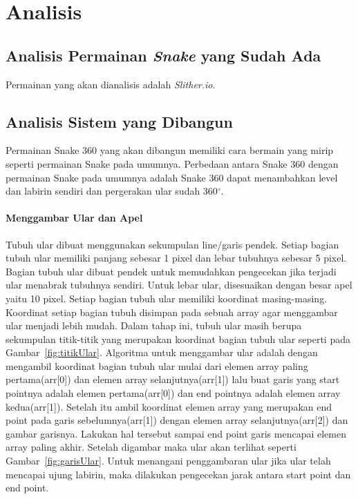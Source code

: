 \chapter{Analisis}
\label{chap:analisis}

\section{Analisis Permainan \textit{Snake} yang Sudah Ada}
Permainan yang akan dianalisis adalah \textit{Slither.io}. 

\section{Analisis Sistem yang Dibangun}
Permainan Snake 360 yang akan dibangun memiliki cara bermain yang mirip seperti permainan Snake pada umumnya. Perbedaan antara Snake 360 dengan permainan Snake pada umumnya adalah Snake 360 dapat menambahkan level dan labirin sendiri dan pergerakan ular sudah 360$^\circ$. 

\subsubsection{Menggambar Ular dan Apel}
Tubuh ular dibuat menggunakan sekumpulan line/garis pendek. Setiap bagian tubuh ular memiliki panjang sebesar 1 pixel dan lebar tubuhnya sebesar 5 pixel. Bagian tubuh ular dibuat pendek untuk memudahkan pengecekan jika terjadi ular menabrak tubuhnya sendiri. Untuk lebar ular, disesuaikan dengan besar apel yaitu 10 pixel. Setiap bagian tubuh ular memiliki koordinat masing-masing. Koordinat setiap bagian tubuh disimpan pada sebuah array agar menggambar ular menjadi lebih mudah. Dalam tahap ini, tubuh ular masih berupa sekumpulan titik-titik yang merupakan koordinat bagian tubuh ular seperti pada Gambar~\ref{fig:titikUlar}. Algoritma untuk menggambar ular adalah dengan mengambil koordinat bagian tubuh ular mulai dari elemen array paling pertama(arr[0]) dan elemen array selanjutnya(arr[1]) lalu buat garis yang start pointnya adalah elemen pertama(arr[0]) dan end pointnya adalah elemen array kedua(arr[1]). Setelah itu ambil koordinat elemen array yang merupakan end point pada garis sebelumnya(arr[1]) dengan elemen array selanjutnya(arr[2]) dan gambar garisnya. Lakukan hal tersebut sampai end point garis mencapai elemen array paling akhir. Setelah digambar maka ular akan terlihat seperti Gambar~\ref{fig:garisUlar}. Untuk menangani penggambaran ular jika ular telah mencapai ujung labirin, maka dilakukan pengecekan jarak antara start point dan end point.  

